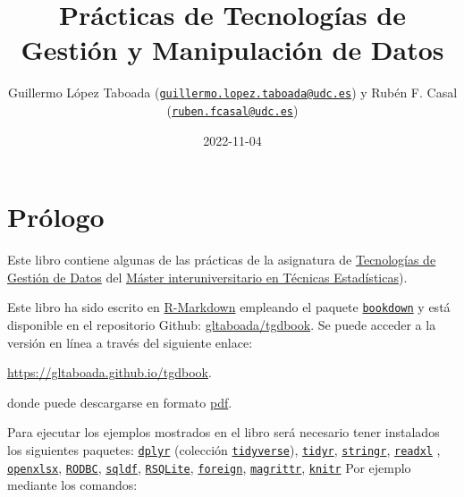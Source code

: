 \documentclass[
]{book}
\title{Prácticas de Tecnologías de Gestión y Manipulación de Datos}
\author{Guillermo López Taboada (\href{mailto:guillermo.lopez.taboada@udc.es}{\nolinkurl{guillermo.lopez.taboada@udc.es}}) y Rubén F. Casal (\href{mailto:ruben.fcasal@udc.es}{\nolinkurl{ruben.fcasal@udc.es}})}
\date{2022-11-04}
\begin{document}
\maketitle

{
\setcounter{tocdepth}{1}
\tableofcontents
}
\hypertarget{pruxf3logo}{%
\chapter*{Prólogo}\label{pruxf3logo}}

Este libro contiene algunas de las prácticas de la asignatura de \href{http://eamo.usc.es/pub/mte/index.php/es/?option=com_content\&view=article\&id=2202\&idm=38\&a\%C3\%B1o=2020}{Tecnologías de Gestión de Datos} del \href{http://eio.usc.es/pub/mte}{Máster interuniversitario en Técnicas Estadísticas}).

Este libro ha sido escrito en \href{http://rmarkdown.rstudio.com}{R-Markdown} empleando el paquete \href{https://bookdown.org/yihui/bookdown/}{\texttt{bookdown}} y está disponible en el repositorio Github: \href{https://github.com/gltaboada/tgdbook}{gltaboada/tgdbook}.
Se puede acceder a la versión en línea a través del siguiente enlace:

\url{https://gltaboada.github.io/tgdbook}.

donde puede descargarse en formato \href{https://gltaboada.github.io/tgdbook/Practicas_de_TGD.pdf}{pdf}.

Para ejecutar los ejemplos mostrados en el libro será necesario tener instalados los siguientes paquetes:
\href{https://dplyr.tidyverse.org}{\texttt{dplyr}} (colección \href{https://www.tidyverse.org/}{\texttt{tidyverse}}),
\href{https://tidyr.tidyverse.org}{\texttt{tidyr}},
\href{https://stringr.tidyverse.org}{\texttt{stringr}},
\href{https://readxl.tidyverse.org}{\texttt{readxl}} ,
\href{https://cran.r-project.org/web/packages/openxlsx/index.html}{\texttt{openxlsx}}, \href{https://cran.r-project.org/web/packages/RODBC/index.html}{\texttt{RODBC}},
\href{https://cran.r-project.org/web/packages/sqldf/index.html}{\texttt{sqldf}},
\href{https://r-dbi.github.io/RSQLite}{\texttt{RSQLite}},
\href{https://cran.r-project.org/web/packages/foreign/index.html}{\texttt{foreign}},
\href{https://cran.r-project.org/web/packages/magrittr/index.html}{\texttt{magrittr}},
\href{https://yihui.name/knitr}{\texttt{knitr}}
Por ejemplo mediante los comandos:
\end{document}
